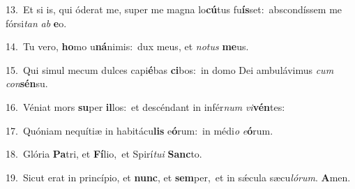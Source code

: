 {\numbfont\textcolor{\numbcolor}{13.}}~Et si is, qui óderat me, super me magna lo\-\textbf{cú}\-tus fu\-\textbf{ís}\-set:~\star abscondíssem me fórsi\textit{tan} \textit{ab} \textbf{e}\-o.\par
{\numbfont\textcolor{\numbcolor}{14.}}~Tu vero, \textbf{ho}\-mo u\-\textbf{ná}\-nimis:~\star dux meus, et \textit{no}\-\textit{tus} \textbf{me}\-us.\par
{\numbfont\textcolor{\numbcolor}{15.}}~Qui simul mecum dulces capi\-\textbf{é}\-bas \textbf{ci}\-bos:~\star in domo Dei ambulávimus \textit{cum} \textit{con}\-\textbf{sén}su.\par
{\numbfont\textcolor{\numbcolor}{16.}}~Véniat mors \textbf{su}\-per \textbf{il}\-los:~\star et descéndant in infér\textit{num} \textit{vi}\-\textbf{vén}tes:\par
{\numbfont\textcolor{\numbcolor}{17.}}~Quóniam nequítiæ in habitácu\textbf{lis} e\-\textbf{ó}\-rum:~\star in médi\textit{o} \textit{e}\-\textbf{ó}rum.\par
{\numbfont\textcolor{\numbcolor}{18.}}~Glória \textbf{Pa}\-tri, et \textbf{Fí}\-lio,~\star et Spirí\-\textit{tu}\-\textit{i} \textbf{Sanc}\-to.\par
{\numbfont\textcolor{\numbcolor}{19.}}~Sicut erat in princípio, et \textbf{nunc}\-, et \textbf{sem}\-per,~\star et in sǽcula sæcu\-\textit{ló}\-\textit{rum}. \textbf{A}\-men.\par
